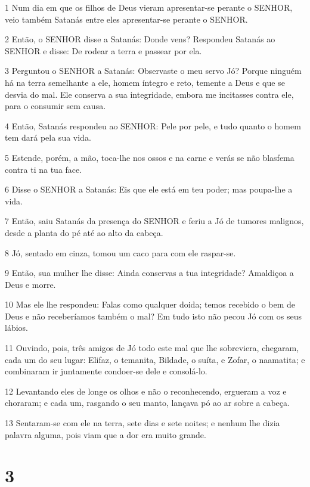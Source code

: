 \par 1 Num dia em que os filhos de Deus vieram apresentar-se perante o SENHOR, veio também Satanás entre eles apresentar-se perante o SENHOR.
\par 2 Então, o SENHOR disse a Satanás: Donde vens? Respondeu Satanás ao SENHOR e disse: De rodear a terra e passear por ela.
\par 3 Perguntou o SENHOR a Satanás: Observaste o meu servo Jó? Porque ninguém há na terra semelhante a ele, homem íntegro e reto, temente a Deus e que se desvia do mal. Ele conserva a sua integridade, embora me incitasses contra ele, para o consumir sem causa.
\par 4 Então, Satanás respondeu ao SENHOR: Pele por pele, e tudo quanto o homem tem dará pela sua vida.
\par 5 Estende, porém, a mão, toca-lhe nos ossos e na carne e verás se não blasfema contra ti na tua face.
\par 6 Disse o SENHOR a Satanás: Eis que ele está em teu poder; mas poupa-lhe a vida.
\par 7 Então, saiu Satanás da presença do SENHOR e feriu a Jó de tumores malignos, desde a planta do pé até ao alto da cabeça.
\par 8 Jó, sentado em cinza, tomou um caco para com ele raspar-se.
\par 9 Então, sua mulher lhe disse: Ainda conservas a tua integridade? Amaldiçoa a Deus e morre.
\par 10 Mas ele lhe respondeu: Falas como qualquer doida; temos recebido o bem de Deus e não receberíamos também o mal? Em tudo isto não pecou Jó com os seus lábios.
\par 11 Ouvindo, pois, três amigos de Jó todo este mal que lhe sobreviera, chegaram, cada um do seu lugar: Elifaz, o temanita, Bildade, o suíta, e Zofar, o naamatita; e combinaram ir juntamente condoer-se dele e consolá-lo.
\par 12 Levantando eles de longe os olhos e não o reconhecendo, ergueram a voz e choraram; e cada um, rasgando o seu manto, lançava pó ao ar sobre a cabeça.
\par 13 Sentaram-se com ele na terra, sete dias e sete noites; e nenhum lhe dizia palavra alguma, pois viam que a dor era muito grande.

\chapter{3}


